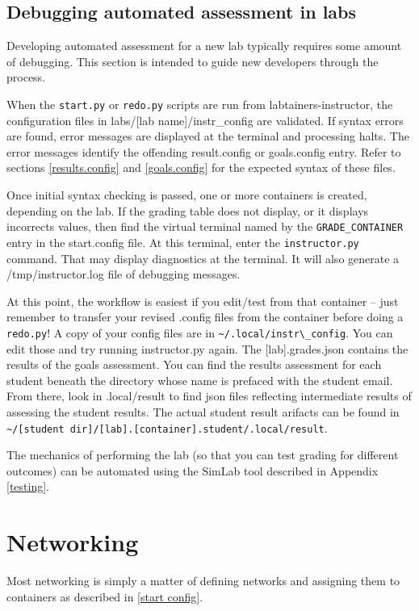 \documentclass[12pt]{article}
\begin{document}
\subsection{Debugging automated assessment in labs}
Developing automated assessment for a new lab typically requires some
amount of debugging.  This section is intended to guide new developers
through the process.

When the {\tt start.py} or {\tt redo.py} scripts are run from labtainers-instructor,
the configuration files in labs/[lab name]/instr\_config are validated.
If syntax errors are found, error messages are displayed at the terminal
and processing halts.  The error messages identify the offending result.config
or goals.config entry.  Refer to sections \ref{results.config} and \ref{goals.config} 
for the expected syntax of these files.

Once initial syntax checking is passed, one or more containers is created,
depending on the lab.  If the grading table does not display, or it displays
incorrects values, then find the virtual terminal named by the {\tt GRADE\_CONTAINER}
entry in the start.config file.  At this terminal, enter the {\tt instructor.py}
command.  That may display diagnostics at the terminal.  It will also generate
a /tmp/instructor.log file of debugging messages. 

At this point, the workflow is easiest if you edit/test from that container --
just remember to transfer your revised .config files from the container before
doing a {\tt redo.py}!  A copy of your config files are in \verb!~/.local/instr\_config!.  You can edit
those and try running instructor.py again.  The [lab].grades.json contains the
results of the goals assessment.  You can find the results assessment for each 
student beneath the directory whose name is prefaced with the student email.  
From there, look in .local/result to find json files reflecting intermediate 
results of assessing the student results.  The actual student result arifacts
can be found in \verb!~/[student dir]/[lab].[container].student/.local/result!. 

The mechanics of performing the lab (so that you can test grading for different outcomes)
can be automated using the SimLab tool described in Appendix \ref{testing}.

\section{Networking} \label{networking}
Most networking is simply a matter of defining networks and assigning them to containers
as described in \ref{start config}.  
\end{document}
